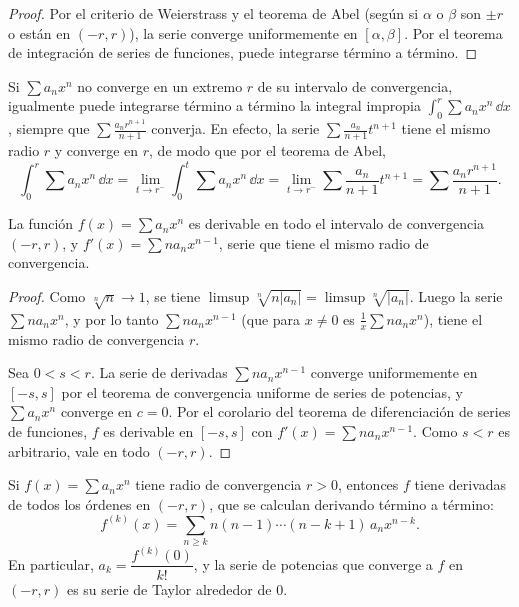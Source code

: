 \begin{proof}
  Por el criterio de Weierstrass y el teorema de Abel (según si \(\alpha\) o \(\beta\) son \(\pm r\) o están en \((-r, r)\)), la serie converge uniformemente en \([\alpha, \beta]\). Por el teorema de integración de series de funciones, puede integrarse término a término.
\end{proof}

Si \(\sum a_n x^n\) no converge en un extremo \(r\) de su intervalo de convergencia, igualmente puede integrarse término a término la integral impropia \(\int_0^r \sum a_n x^n \,\dd x\), siempre que \(\sum \frac{a_n r^{n+1}}{n+1}\) converja. En efecto, la serie \(\sum \frac{a_n}{n+1} t^{n+1}\) tiene el mismo radio \(r\) y converge en \(r\), de modo que por el teorema de Abel,
\[
  \int_0^r \sum a_n x^n \,\dd x = \lim_{t \to r^{-}} \int_0^t \sum a_n x^n \,\dd x = \lim_{t \to r^{-}} \sum \frac{a_n}{n + 1} t^{n+1} = \sum \frac{a_n r^{n+1}}{n + 1}.
\]

\begin{theorem}
  La función \(f(x) = \sum a_n x^n\) es derivable en todo el intervalo de convergencia \((-r, r)\), y \(f'(x) = \sum n a_n x^{n-1}\), serie que tiene el mismo radio de convergencia.
\end{theorem}

\begin{proof}
  Como \(\sqrt[n]{n} \to 1\), se tiene \(\limsup \sqrt[n]{n |a_n|} = \limsup \sqrt[n]{|a_n|}\). Luego la serie \(\sum n a_n x^n\), y por lo tanto \(\sum n a_n x^{n-1}\) (que para \(x \neq 0\) es \(\frac{1}{x} \sum n a_n x^n\)), tiene el mismo radio de convergencia \(r\).

  Sea \(0 < s < r\). La serie de derivadas \(\sum n a_n x^{n-1}\) converge uniformemente en \([-s, s]\) por el teorema de convergencia uniforme de series de potencias, y \(\sum a_n x^n\) converge en \(c = 0\). Por el corolario del teorema de diferenciación de series de funciones, \(f\) es derivable en \([-s, s]\) con \(f'(x) = \sum n a_n x^{n-1}\). Como \(s < r\) es arbitrario, vale en todo \((-r, r)\).
\end{proof}

\begin{corollary}
  Si \(f(x) = \sum a_n x^n\) tiene radio de convergencia \(r > 0\), entonces \(f\) tiene derivadas de todos los órdenes en \((-r, r)\), que se calculan derivando término a término:
  \[
    f^{(k)}(x) = \sum_{n \geq k} n (n - 1) \cdots (n - k + 1)\, a_n x^{n-k}.
  \]
  En particular, \(a_k = \dfrac{f^{(k)}(0)}{k!}\), y la serie de potencias que converge a \(f\) en \((-r, r)\) es su serie de Taylor alrededor de \(0\).
\end{corollary}

